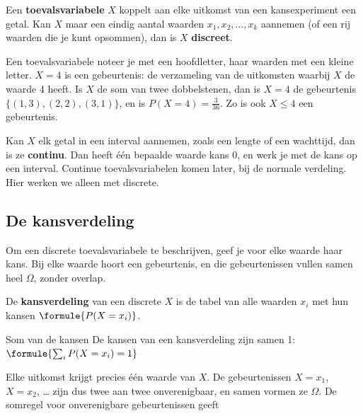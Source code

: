 \begin{theorie}
Een \textbf{\textcolor{accent}{toevalsvariabele}} $X$ koppelt aan elke uitkomst van een kansexperiment een getal. Kan $X$ maar een eindig aantal waarden $x_1, x_2, \ldots, x_k$ aannemen (of een rij waarden die je kunt opsommen), dan is $X$ \textbf{\textcolor{accent}{discreet}}.
\end{theorie}

Een toevalsvariabele noteer je met een hoofdletter, haar waarden met een kleine letter. \textit{$X = 4$} is een gebeurtenis: de verzameling van de uitkomsten waarbij $X$ de waarde 4 heeft. Is $X$ de som van twee dobbelstenen, dan is \textit{$X = 4$} de gebeurtenis $\{(1, 3), (2, 2), (3, 1)\}$, en is $P(X = 4) = \frac{3}{36}$. Zo is ook \textit{$X \leqslant 4$} een gebeurtenis.

Kan $X$ elk getal in een interval aannemen, zoals een lengte of een wachttijd, dan is ze \textbf{continu}. Dan heeft één bepaalde waarde kans 0, en werk je met de kans op een interval. Continue toevalsvariabelen komen later, bij de normale verdeling. Hier werken we alleen met discrete.

\subsection{De kansverdeling}

Om een discrete toevalsvariabele te beschrijven, geef je voor elke waarde haar kans. Bij elke waarde hoort een gebeurtenis, en die gebeurtenissen vullen samen heel $\Omega$, zonder overlap.

\begin{theorie}
De \textbf{\textcolor{accent}{kansverdeling}} van een discrete $X$ is de tabel van alle waarden $x_i$ met hun kansen $\formule{P(X = x_i)}$.

\begin{stelling}{Som van de kansen}
De kansen van een kansverdeling zijn samen 1: \quad $\formule{\sum_i P(X = x_i) = 1}$
\end{stelling}

\begin{bewijs}
Elke uitkomst krijgt precies één waarde van $X$. De gebeurtenissen $X = x_1$, $X = x_2$, \ldots{} zijn dus twee aan twee onverenigbaar, en samen vormen ze $\Omega$. De somregel voor onverenigbare gebeurtenissen geeft
\end{bewijs}
\end{theorie}

